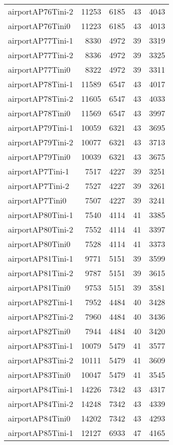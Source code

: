\begin{longtable}{lrrrr}
airportAP76Tini-2 & 11253 & 6185 & 43 & 4043 \\
airportAP76Tini0 & 11223 & 6185 & 43 & 4013 \\
airportAP77Tini-1 & 8330 & 4972 & 39 & 3319 \\
airportAP77Tini-2 & 8336 & 4972 & 39 & 3325 \\
airportAP77Tini0 & 8322 & 4972 & 39 & 3311 \\
airportAP78Tini-1 & 11589 & 6547 & 43 & 4017 \\
airportAP78Tini-2 & 11605 & 6547 & 43 & 4033 \\
airportAP78Tini0 & 11569 & 6547 & 43 & 3997 \\
airportAP79Tini-1 & 10059 & 6321 & 43 & 3695 \\
airportAP79Tini-2 & 10077 & 6321 & 43 & 3713 \\
airportAP79Tini0 & 10039 & 6321 & 43 & 3675 \\
airportAP7Tini-1 & 7517 & 4227 & 39 & 3251 \\
airportAP7Tini-2 & 7527 & 4227 & 39 & 3261 \\
airportAP7Tini0 & 7507 & 4227 & 39 & 3241 \\
airportAP80Tini-1 & 7540 & 4114 & 41 & 3385 \\
airportAP80Tini-2 & 7552 & 4114 & 41 & 3397 \\
airportAP80Tini0 & 7528 & 4114 & 41 & 3373 \\
airportAP81Tini-1 & 9771 & 5151 & 39 & 3599 \\
airportAP81Tini-2 & 9787 & 5151 & 39 & 3615 \\
airportAP81Tini0 & 9753 & 5151 & 39 & 3581 \\
airportAP82Tini-1 & 7952 & 4484 & 40 & 3428 \\
airportAP82Tini-2 & 7960 & 4484 & 40 & 3436 \\
airportAP82Tini0 & 7944 & 4484 & 40 & 3420 \\
airportAP83Tini-1 & 10079 & 5479 & 41 & 3577 \\
airportAP83Tini-2 & 10111 & 5479 & 41 & 3609 \\
airportAP83Tini0 & 10047 & 5479 & 41 & 3545 \\
airportAP84Tini-1 & 14226 & 7342 & 43 & 4317 \\
airportAP84Tini-2 & 14248 & 7342 & 43 & 4339 \\
airportAP84Tini0 & 14202 & 7342 & 43 & 4293 \\
airportAP85Tini-1 & 12127 & 6933 & 47 & 4165 \\

\end{longtable}
